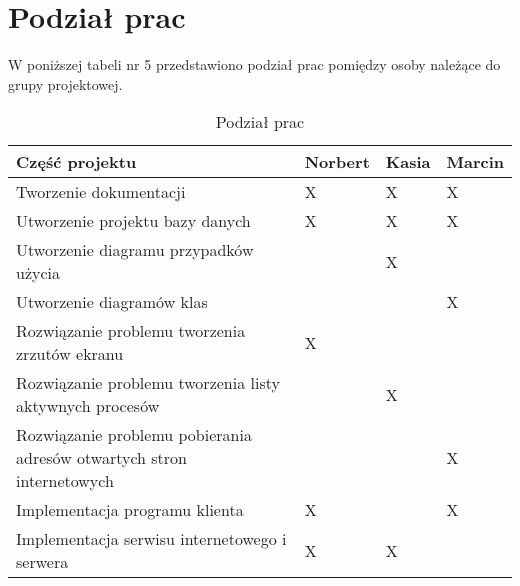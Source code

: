 \section{Podział prac}

W poniższej tabeli nr 5 przedstawiono podział prac pomiędzy osoby należące do grupy projektowej.

\begin{table}[!ht]
\caption{\label{tab:widgets}Podział prac}
\begin{tabular}{| m{8cm} | m{1.6cm} | m{1.6cm} | m{1.6cm} |} 

\hline
Część projektu & Norbert & Kasia & Marcin \\ \hline

Tworzenie dokumentacji & X  & X &  X \\ \hline

Utworzenie projektu bazy danych & X  & X &  X \\ \hline

Utworzenie diagramu przypadków użycia &   & X &   \\ \hline

Utworzenie diagramów klas &   &  &  X \\ \hline

Rozwiązanie problemu tworzenia zrzutów ekranu & X  &  &   \\ \hline
Rozwiązanie problemu tworzenia listy aktywnych procesów &   & X &   \\ \hline

Rozwiązanie problemu pobierania adresów otwartych stron internetowych &   &  &  X \\ \hline

Implementacja programu klienta & X  &  &  X \\ \hline
Implementacja serwisu internetowego i serwera & X  & X &   \\ \hline








\end{tabular}
\end{table}